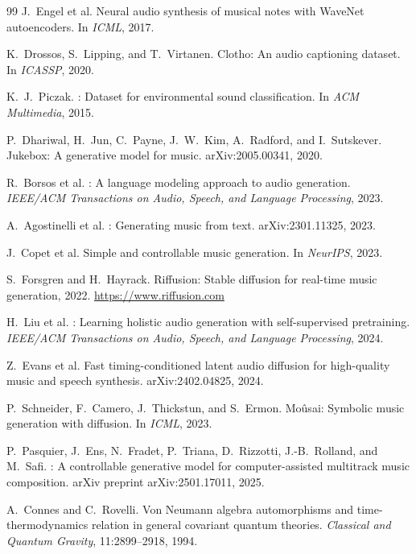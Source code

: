 \documentclass[12pt,a4paper]{article}
\begin{document}
\begin{thebibliography}{99}
J.\ Engel et al.
\newblock Neural audio synthesis of musical notes with {WaveNet} autoencoders.
\newblock In \textit{ICML}, 2017.

K.\ Drossos, S.\ Lipping, and T.\ Virtanen.
\newblock Clotho: An audio captioning dataset.
\newblock In \textit{ICASSP}, 2020.

K.\ J.\ Piczak.
: Dataset for environmental sound classification.
\newblock In \textit{ACM Multimedia}, 2015.

P.\ Dhariwal, H.\ Jun, C.\ Payne, J.\ W.\ Kim, A.\ Radford, and I.\ Sutskever.
\newblock Jukebox: A generative model for music.
\newblock arXiv:2005.00341, 2020.

R.\ Borsos et al.
: A language modeling approach to audio generation.
\newblock \textit{IEEE/ACM Transactions on Audio, Speech, and Language
Processing}, 2023.

A.\ Agostinelli et al.
: Generating music from text.
\newblock arXiv:2301.11325, 2023.

J.\ Copet et al.
\newblock Simple and controllable music generation.
\newblock In \textit{NeurIPS}, 2023.

S.\ Forsgren and H.\ Hayrack.
\newblock Riffusion: Stable diffusion for real-time music generation,
2022.
\newblock \url{https://www.riffusion.com}

H.\ Liu et al.
: Learning holistic audio generation with
self-supervised pretraining.
\newblock \textit{IEEE/ACM Transactions on Audio, Speech, and Language
Processing}, 2024.

Z.\ Evans et al.
\newblock Fast timing-conditioned latent audio diffusion for
high-quality music and speech synthesis.
\newblock arXiv:2402.04825, 2024.

P.\ Schneider, F.\ Camero, J.\ Thickstun, and S.\ Ermon.
\newblock Mo\^usai: Symbolic music generation with diffusion.
\newblock In \textit{ICML}, 2023.

P.\ Pasquier, J.\ Ens, N.\ Fradet, P.\ Triana, D.\ Rizzotti,
J.-B.\ Rolland, and M.\ Safi.
: A controllable generative model for
computer-assisted multitrack music composition.
\newblock arXiv preprint arXiv:2501.17011, 2025.

A.\ Connes and C.\ Rovelli.
\newblock Von Neumann algebra automorphisms and
time-thermodynamics relation in general covariant quantum theories.
\newblock \textit{Classical and Quantum Gravity}, 11:2899--2918, 1994.


\end{thebibliography}
\end{document}
